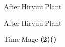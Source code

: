\begin{paracol}{2}
\switchcolumn*
\vspace{-2.15cm}
\begin{steproute}{After Hiryuu Plant}
\end{steproute}

\switchcolumn
\begin{menu}{After Hiryuu Plant}
    \varwb
    \begin{jobMenu}
        \faris Time Mage \textbf{(2\pointLeft)(\pointUp)}
    \end{jobMenu}
    \begin{magicMenu}
        \faris \exit
    \end{magicMenu}
    \varwe
\end{menu}

\end{paracol}